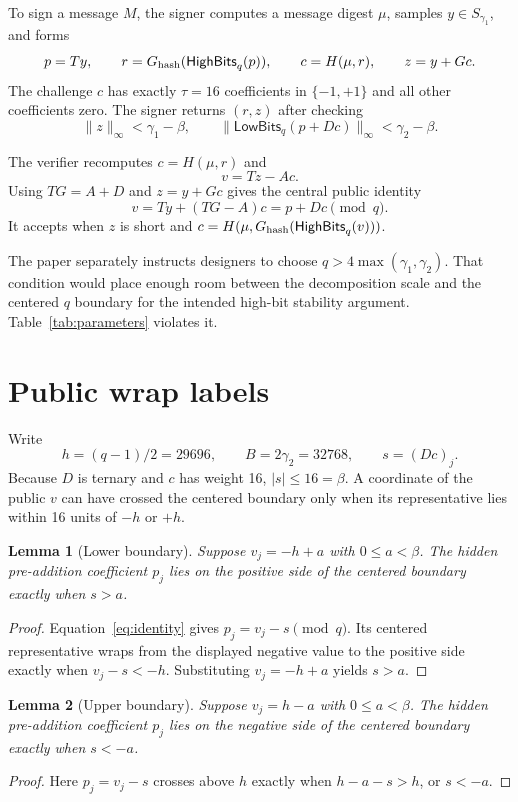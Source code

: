 \documentclass[10pt,a4paper]{article}
\newtheorem{lemma}{Lemma}
\newcommand{\HB}{\mathsf{HighBits}_q}
\newcommand{\LB}{\mathsf{LowBits}_q}
\begin{document}
To sign a message $M$, the signer computes a message digest $\mu$, samples
$y\in S_{\gamma_1}$, and forms
\[
  p=Ty,\qquad r=G_{\rm hash}(\HB(p)),\qquad
  c=H(\mu,r),\qquad z=y+Gc.
\]
The challenge $c$ has exactly $\tau=16$ coefficients in $\{-1,+1\}$ and all
other coefficients zero. The signer returns $(r,z)$ after checking
\[
  \lVert z\rVert_\infty < \gamma_1-\beta,
  \qquad
  \lVert\LB(p+Dc)\rVert_\infty < \gamma_2-\beta.
\]

The verifier recomputes $c=H(\mu,r)$ and
\[
  v=Tz-Ac.
\]
Using $TG=A+D$ and $z=y+Gc$ gives the central public identity
\begin{equation}
  v=Ty+(TG-A)c=p+Dc\pmod q.          \label{eq:identity}
\end{equation}
It accepts when $z$ is short and
$c=H(\mu,G_{\rm hash}(\HB(v)))$.

The paper separately instructs designers to choose
$q>4\max(\gamma_1,\gamma_2)$. That condition would place enough room between
the decomposition scale and the centered $q$ boundary for the intended
high-bit stability argument. Table~\ref{tab:parameters} violates it.

\section{Public wrap labels}
\label{sec:labels}

Write
\[
  h=(q-1)/2=29696,\qquad B=2\gamma_2=32768,
  \qquad s=(Dc)_j.
\]
Because $D$ is ternary and $c$ has weight 16, $|s|\leq16=\beta$. A coordinate
of the public $v$ can have crossed the centered boundary only when its
representative lies within 16 units of $-h$ or $+h$.

\begin{lemma}[Lower boundary]
Suppose $v_j=-h+a$ with $0\leq a<\beta$. The hidden pre-addition coefficient
$p_j$ lies on the positive side of the centered boundary exactly when
$s>a$.
\end{lemma}
\begin{proof}
Equation~\eqref{eq:identity} gives $p_j=v_j-s\pmod q$. Its centered
representative wraps from the displayed negative value to the positive side
exactly when $v_j-s<-h$. Substituting $v_j=-h+a$ yields $s>a$.
\end{proof}

\begin{lemma}[Upper boundary]
Suppose $v_j=h-a$ with $0\leq a<\beta$. The hidden pre-addition coefficient
$p_j$ lies on the negative side of the centered boundary exactly when
$s<-a$.
\end{lemma}
\begin{proof}
Here $p_j=v_j-s$ crosses above $h$ exactly when
$h-a-s>h$, or $s<-a$.
\end{proof}
\end{document}
